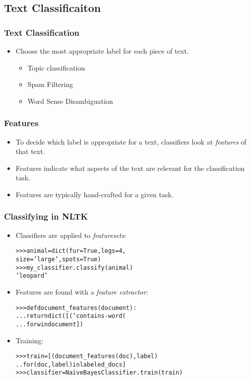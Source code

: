 \documentclass{beamer}             %
\begin{document}
\subsection{Text Classificaiton}

\begin{frame}
  \frametitle{Text Classification}
  \begin{itemize}
    \item Choose the most appropriate label for each piece of text.
    \begin{itemize}
      \item Topic classification
      \item Spam Filtering
      \item Word Sense Disambiguation
    \end{itemize}
  \end{itemize}
\end{frame}

\begin{frame}
  \frametitle{Features}
  \begin{itemize}
    \item To decide which label is appropriate for a text, 
      classifiers look at \emph{features} of that text.
    \item Features indicate what aspects of the text are
      relevant for the classification task.
    \item Features are typically hand-crafted for a given task.
  \end{itemize}
\end{frame}

\begin{frame}[fragile]
  \frametitle{Classifying in NLTK}
  \begin{itemize}
    \item Classifiers are applied to \emph{featuresets}:
{\small\begin{alltt}
>>> animal = dict(fur=True, legs=4, 
                  size='large', spots=True)
>>> my_classifier.classify(animal)
'leopard'
\end{alltt}}
    \item Features are found with a \emph{feature extractor}:
{\small\begin{alltt}
>>> def document_features(document):
...     return dict([('contains-word(%s)'%w,True) 
...                  for w in document])
\end{alltt}}
    \item Training:
{\small\begin{alltt}
>>> train = [(document_features(doc), label)
..           for (doc, label) in labeled_docs]
>>> classifier = NaiveBayesClassifier.train(train)
\end{alltt}}

  \end{itemize}
\end{frame}
\end{document}
